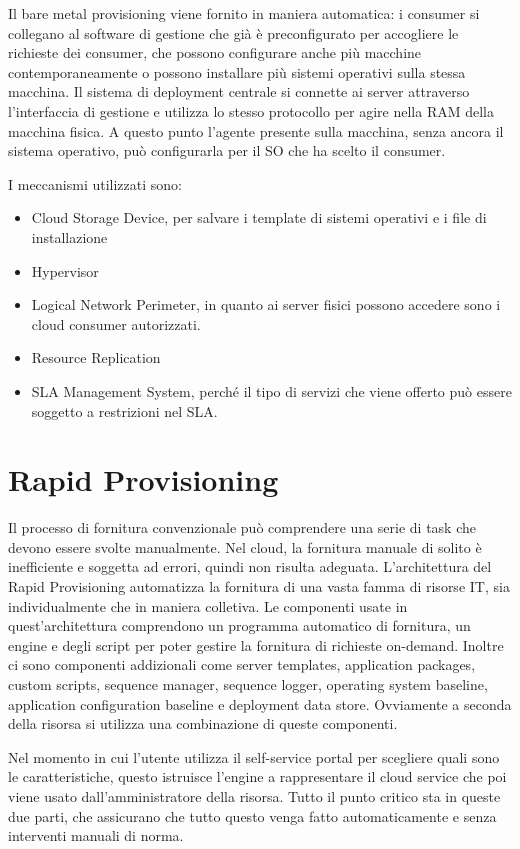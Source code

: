 Il bare metal provisioning viene fornito in maniera automatica: i consumer si collegano al software di gestione che già è preconfigurato per accogliere le richieste dei consumer, che possono configurare anche più macchine contemporaneamente o possono installare più sistemi operativi sulla stessa macchina. Il sistema di deployment centrale si connette ai server attraverso l'interfaccia di gestione e utilizza lo stesso protocollo per agire nella RAM della macchina fisica. A questo punto l'agente presente sulla macchina, senza ancora il sistema operativo, può configurarla per il SO che ha scelto il consumer.

I meccanismi utilizzati sono:
\begin{itemize}
    \item Cloud Storage Device, per salvare i template di sistemi operativi e i file di installazione
    \item Hypervisor
    \item Logical Network Perimeter, in quanto ai server fisici possono accedere sono i cloud consumer autorizzati.
    \item Resource Replication
    \item SLA Management System, perché il tipo di servizi che viene offerto può essere soggetto a restrizioni nel SLA.
\end{itemize}

\section{Rapid Provisioning}
Il processo di fornitura convenzionale può comprendere una serie di task che devono essere svolte manualmente. Nel cloud, la fornitura manuale di solito è inefficiente e soggetta ad errori, quindi non risulta adeguata. L'architettura del Rapid Provisioning automatizza la fornitura di una vasta famma di risorse IT, sia individualmente che in maniera colletiva.
Le componenti usate in quest'architettura comprendono un programma automatico di fornitura, un engine e degli script per poter gestire la fornitura di richieste on-demand. Inoltre ci sono componenti addizionali come server templates, application packages, custom scripts, sequence manager, sequence logger, operating system baseline, application configuration baseline e deployment data store. Ovviamente a seconda della risorsa si utilizza una combinazione di queste componenti.

\vspace{5mm}

Nel momento in cui l'utente utilizza il self-service portal per scegliere quali sono le caratteristiche, questo istruisce l'engine a rappresentare il cloud service che poi viene usato dall'amministratore della risorsa. Tutto il punto critico sta in queste due parti, che assicurano che tutto questo venga fatto automaticamente e senza interventi manuali di norma.

